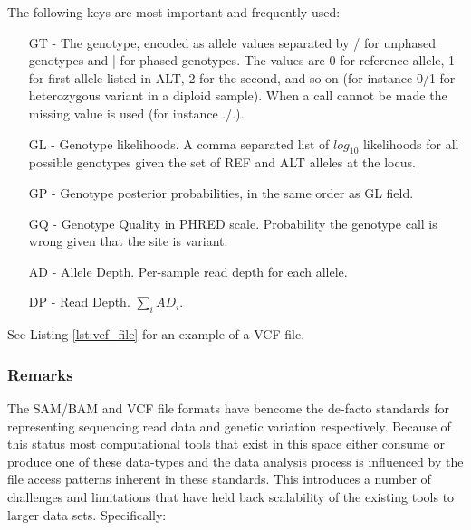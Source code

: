 The following keys are most important and frequently used:

\begin{itemize}
    \item [GT] - The genotype, encoded as allele values separated by / for unphased genotypes and | for phased genotypes. The values are 0 for reference allele, 1 for first allele listed in ALT, 2 for the second, and so on (for instance 0/1 for heterozygous variant in a diploid sample). When a call cannot be made the missing value is used (for instance ./.).
    \item [GL] - Genotype likelihoods. A comma separated list of $log_{10}$ likelihoods for all possible genotypes given the set of REF and ALT alleles at the locus.
    \item [GP] - Genotype posterior probabilities, in the same order as GL field.
    \item [GQ] - Genotype Quality in PHRED scale. Probability the genotype call is wrong given that the site is variant.
    \item [AD] - Allele Depth. Per-sample read depth for each allele.
    \item [DP] - Read Depth. $\sum_i AD_i$.
\end{itemize}

See Listing \ref{lst:vcf_file} for an example of a VCF file.

\subsubsection{Remarks}

The SAM/BAM and VCF file formats have bencome the de-facto standards for representing sequencing read data and genetic variation respectively. Because of this status most computational tools that exist in this space either consume or produce one of these data-types and the data analysis process is influenced by the file access patterns inherent in these standards. This introduces a number of challenges and limitations that have held back scalability of the existing tools to larger data sets. Specifically:

